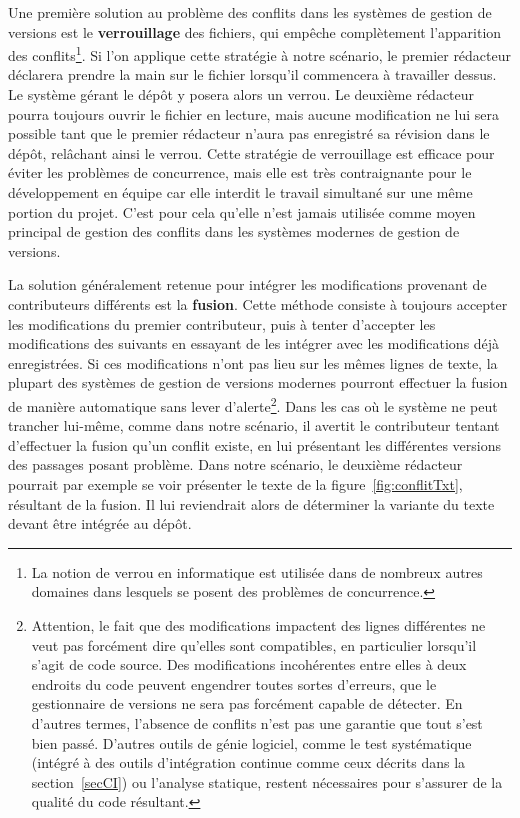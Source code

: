 Une première solution au problème des conflits dans les systèmes de
gestion de versions est le \textbf{verrouillage} des
fichiers, qui empêche complètement l'apparition des
conflits\footnote{La notion de verrou en informatique est utilisée
  dans de nombreux autres domaines dans lesquels se posent des
  problèmes de concurrence.}. Si l'on applique cette stratégie à notre
scénario, le premier rédacteur déclarera prendre la main sur le
fichier lorsqu'il commencera à travailler dessus. Le système gérant le
dépôt y posera alors un verrou. Le deuxième rédacteur pourra toujours
ouvrir le fichier en lecture, mais aucune modification ne lui sera
possible tant que le premier rédacteur n'aura pas enregistré sa
révision dans le dépôt, relâchant ainsi le verrou. Cette stratégie de
verrouillage est efficace pour éviter les problèmes de concurrence,
mais elle est très contraignante pour le développement en équipe car
elle interdit le travail simultané sur une même portion du
projet. C'est pour cela qu'elle n'est jamais utilisée comme moyen
principal de gestion des conflits dans les systèmes modernes de
gestion de versions.

La solution généralement retenue pour intégrer les modifications
provenant de contributeurs différents est la
\textbf{fusion}. Cette méthode consiste à toujours
accepter les modifications du premier contributeur, puis à tenter
d'accepter les modifications des suivants en essayant de les intégrer
avec les modifications déjà enregistrées. Si ces modifications n'ont
pas lieu sur les mêmes lignes de texte, la plupart des systèmes de
gestion de versions modernes pourront effectuer la fusion de manière
automatique sans lever d'alerte\footnote{Attention, le fait que des
  modifications impactent des lignes différentes ne veut pas forcément
  dire qu'elles sont compatibles, en particulier lorsqu'il s'agit de
  code source. Des modifications incohérentes entre elles à deux
  endroits du code peuvent engendrer toutes sortes d'erreurs, que le
  gestionnaire de versions ne sera pas forcément capable de
  détecter. En d'autres termes, l'absence de conflits n'est pas une
  garantie que tout s'est bien passé. D'autres outils de génie
  logiciel, comme le test systématique (intégré à des outils
  d'intégration continue comme ceux décrits dans la
  section~\ref{secCI}) ou l'analyse statique, restent nécessaires pour
  s'assurer de la qualité du code résultant.}. Dans les cas où le
système ne peut trancher lui-même, comme dans notre scénario, il
avertit le contributeur tentant d'effectuer la fusion qu'un conflit
existe, en lui présentant les différentes versions des passages posant
problème. Dans notre scénario, le deuxième rédacteur pourrait par
exemple se voir présenter le texte de la figure~\ref{fig:conflitTxt},
résultant de la fusion. Il lui reviendrait alors de déterminer la
variante du texte devant être intégrée au dépôt.


